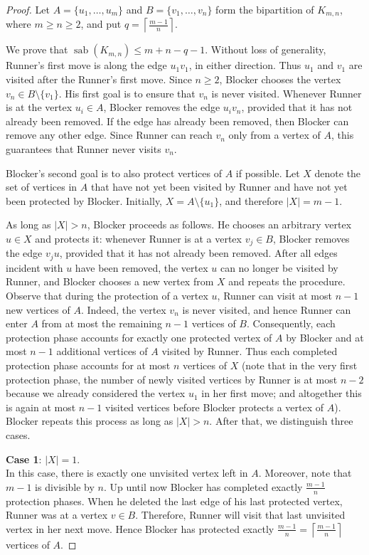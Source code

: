 \documentclass[12pt]{article}
\DeclareMathOperator{\sab}{\mathrm{sab}}
\begin{document}
\begin{proof}
Let $A=\{u_1,\ldots,u_m\}$ and $B=\{v_1,\ldots,v_n\}$ form the bipartition of $K_{m,n}$, where $m \ge n \ge 2$, and put $q=\left\lceil\frac{m-1}{n}\right\rceil$. 

We prove that $\sab(K_{m,n})\le m+n-q-1$. Without loss of generality, Runner's first move is along the edge $u_1v_1$, in either direction. Thus $u_1$ and $v_1$ are visited after the Runner's first move. Since $n \ge 2$, Blocker chooses the vertex $v_n\in B\setminus\{v_1\}$. His first goal is to ensure that $v_n$ is never visited. Whenever Runner is at the vertex $u_i \in A$, Blocker removes the edge $u_iv_n$, provided that it has not already been removed. If the edge has already been removed, then Blocker can remove any other edge. Since Runner can reach $v_n$ only from a vertex of $A$, this guarantees that Runner never visits $v_n$.

Blocker's second goal is to also protect vertices of $A$ if possible. Let $X$ denote the set of vertices in $A$ that have not yet been visited by Runner and have not yet been protected by Blocker. Initially, $X=A\setminus\{u_1\}$, and therefore $|X|=m-1$.

As long as $|X|>n$, Blocker proceeds as follows. He chooses an arbitrary vertex $u\in X$ and protects it: whenever Runner is at a vertex $v_j\in B$, Blocker removes the edge $v_ju$, provided that it has not already been removed. After all edges incident with $u$ have been removed, the vertex $u$ can no longer be visited by Runner, and Blocker chooses a new vertex from $X$ and repeats the procedure. Observe that during the protection of a vertex $u$, Runner can visit at most $n-1$ new vertices of $A$. Indeed, the vertex $v_n$ is never visited, and hence Runner can enter $A$ from at most the remaining $n-1$ vertices of $B$. Consequently, each protection phase accounts for exactly one protected vertex of $A$ by Blocker and at most $n-1$ additional vertices of $A$ visited by Runner. Thus each completed protection phase accounts for at most $n$ vertices of $X$ (note that in the very first protection phase, the number of newly visited vertices by Runner is at most $n-2$ because we already considered the vertex $u_1$ in her first move; and altogether this is again at most $n-1$ visited vertices before Blocker protects a vertex of $A$). Blocker repeats this process as long as $|X|>n$. After that, we distinguish three cases.

\medskip\noindent
{\bf Case 1}: $|X|=1$. \\
In this case, there is exactly one unvisited vertex left in $A$. Moreover, note that $m-1$ is divisible by $n$. Up until now Blocker has completed exactly $\frac{m-1}{n}$ protection phases. When he deleted the last edge of his last protected vertex, Runner was at a vertex $v \in B$. Therefore, Runner will visit that last unvisited vertex in her next move. Hence Blocker has protected exactly $\frac{m-1}{n}=\left\lceil\frac{m-1}{n}\right\rceil$ vertices of $A$.


\end{proof}
\end{document}
